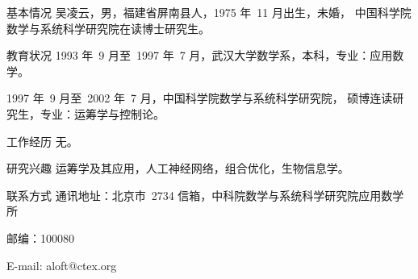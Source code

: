 
\begin{resume}

\begin{resumesection}{基本情况}
吴凌云，男，福建省屏南县人，1975 年~11 月出生，未婚，
中国科学院数学与系统科学研究院在读博士研究生。
\end{resumesection}

\begin{resumelist}{教育状况}
1993 年~9 月至~1997 年~7 月，武汉大学数学系，本科，专业：应用数学。

1997 年~9 月至~2002 年~7 月，中国科学院数学与系统科学研究院，
硕博连读研究生，专业：运筹学与控制论。
\end{resumelist}

\begin{resumelist}{工作经历}
无。
\end{resumelist}

\begin{resumelist}{研究兴趣}
运筹学及其应用，人工神经网络，组合优化，生物信息学。
\end{resumelist}

\begin{resumelist}{联系方式}
通讯地址：北京市~2734 信箱，中科院数学与系统科学研究院应用数学所

邮编：100080

E-mail: aloft@ctex.org
\end{resumelist}

\end{resume}
